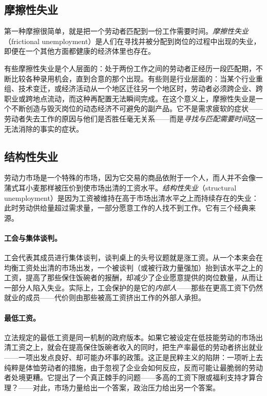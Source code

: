 \subsection{摩擦性失业}

第一种摩擦很简单，就是把一个劳动者匹配到一份工作需要时间。\emph{摩擦性失业}（frictional unemployment）是人们在寻找并被分配到岗位的过程中出现的失业，即便在一个其他方面都健康的经济体里也存在。


有些摩擦性失业是个人层面的：处于两份工作之间的劳动者正经历一段匹配期，不断比较各种录用机会，直到合意的那个出现。有些则是行业层面的：当某个行业重组、技术变迁，或经济活动从一个地区迁往另一个地区时，劳动者必须跨企业、跨职业或跨地点流动，而这种再配置无法瞬间完成。在这个意义上，摩擦性失业是一个不断创造与毁灭岗位的动态经济不可避免的副产品。它不是需求疲软的症状——劳动者失去工作的原因与他们是否胜任毫无关系——而是\emph{寻找与匹配需要时间}这一无法消除的事实的症状。

\subsection{结构性失业}

劳动力市场是一个特殊的市场，因为它交易的商品依附于一个人，而人并不会像一蒲式耳小麦那样被压价到使市场出清的工资水平。\emph{结构性失业}（structural unemployment）是因为工资被维持在高于市场出清水平之上而持续存在的失业：此时劳动供给量超过需求量，一部分愿意工作的人找不到工作。它有三个经典来源。


\paragraph{工会与集体谈判。}
工会代表其成员进行集体谈判，谈判桌上的头号议题就是涨工资。从一个本来会在均衡工资处出清的市场出发，一个被谈判（或被行政力量强加）抬到该水平之上的工资，提高了那些保住饭碗者的报酬，却减少了企业愿意提供的岗位数量，从而让一部分人陷入失业。实际上，工会保护的是它的\emph{内部人}——那些在更高工资下仍然就业的成员——代价则由那些被高工资挤出工作的外部人承担。

\paragraph{最低工资。}
立法规定的最低工资是同一机制的政府版本。如果它被设定在低技能劳动的市场出清工资之上，就会在提高保住饭碗者收入的同时，把生产率最低的劳动者挤出就业——一项出发点良好、却可能办坏事的政策。这正是民粹主义的陷阱：一项听上去纯粹是体恤劳动者的措施，由于忽视了企业会如何反应，反而可能让最脆弱的劳动者处境更糟。它提出了一个真正棘手的问题——多高的工资下限或福利支持才算合理？——对此，市场力量给出一个答案，政治压力给出另一个答案。

